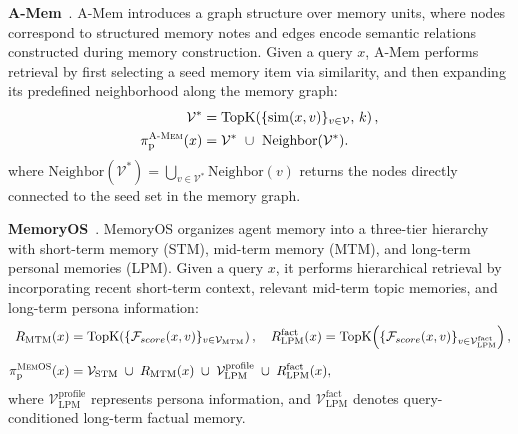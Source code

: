\textbf{A-Mem}~\cite{DBLP:journals/corr/abs-2502-12110}.
A-Mem introduces a graph structure over memory units, where nodes correspond to structured memory notes and edges encode semantic relations constructed during memory construction. 
Given a query $x$, A-Mem performs retrieval by first selecting a seed memory item via similarity, and then expanding its predefined neighborhood along the memory graph: %
\begin{equation}
\begin{aligned}
\mathcal{V}^* &= \mathrm{TopK}\!\left(\{\mathrm{sim}(x,v)\}_{v\in\mathcal{V}},\,k\right),\\
\pi_{\mathrm p}^{\textsc{A-Mem}}(x)
&=
\mathcal{V}^* \ \cup\ \mathrm{Neighbor}(\mathcal{V}^*).
\end{aligned}
\end{equation}
where $\mathrm{Neighbor}(\mathcal{V}^*) = \bigcup_{v\in\mathcal{V}^*}\mathrm{Neighbor}(v)$
returns the nodes directly connected to the seed set in the memory graph. 

\textbf{MemoryOS}~\cite{DBLP:journals/corr/abs-2506-06326}.
MemoryOS organizes agent memory into a three-tier hierarchy with short-term memory (STM), mid-term memory (MTM), and long-term personal memories (LPM). Given a query $x$, it performs hierarchical retrieval by incorporating recent short-term context, relevant mid-term topic memories, and long-term persona information:
\begin{equation}
\begin{aligned}
R_{\mathrm{MTM}}(x)
&=
\mathrm{TopK}\!\left(
\{\mathcal{F}_{score}(x,v)\}_{v\in \mathcal{V}_{\mathrm{MTM}}}
\right),
\quad
R_{\mathrm{LPM}}^{\mathrm{fact}}(x)
=
\mathrm{TopK}\!\left(
\{\mathcal{F}_{score}(x,v)\}_{v\in \mathcal{V}_{\mathrm{LPM}}^{\mathrm{fact}}}
\right),\\[6pt]
\pi_{\mathrm p}^{\textsc{MemOS}}(x)
&=
\mathcal{V}_{\mathrm{STM}}
\;\cup\;
R_{\mathrm{MTM}}(x)
\;\cup\;
\mathcal{V}_{\mathrm{LPM}}^{\mathrm{profile}}
\;\cup\;
R_{\mathrm{LPM}}^{\mathrm{fact}}(x),
\end{aligned}
\end{equation}
where $\mathcal{V}_{\mathrm{LPM}}^{\mathrm{profile}}$ represents persona information, and $\mathcal{V}_{\mathrm{LPM}}^{\mathrm{fact}}$ denotes query-conditioned long-term factual memory.


